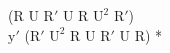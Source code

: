 (R U $\text{R}'$ U R $\text{U}^2$ $\text{R}'$)\\
$\text{y}'$ ($\text{R}'$ $\text{U}^2$ R U $\text{R}'$ U R) *\\
